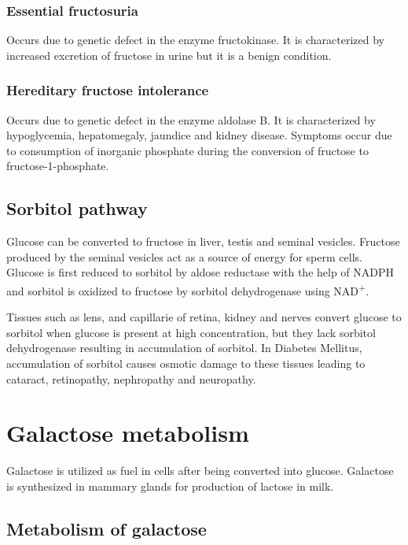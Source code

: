 \documentclass[
]{book}
\begin{document}
\subsection{Essential fructosuria}\label{essential-fructosuria}

Occurs due to genetic defect in the enzyme fructokinase. It is characterized by increased excretion of fructose in urine but it is a benign condition.

\subsection{Hereditary fructose intolerance}\label{hereditary-fructose-intolerance}

Occurs due to genetic defect in the enzyme aldolase B. It is characterized by hypoglycemia, hepatomegaly, jaundice and kidney disease. Symptoms occur due to consumption of inorganic phosphate during the conversion of fructose to fructose-1-phosphate.

\section{Sorbitol pathway}\label{sorbitol-pathway-1}

Glucose can be converted to fructose in liver, testis and seminal vesicles. Fructose produced by the seminal vesicles act as a source of energy for sperm cells. Glucose is first reduced to sorbitol by aldose reductase with the help of NADPH and sorbitol is oxidized to fructose by sorbitol dehydrogenase using NAD\textsuperscript{+}.

Tissues such as lens, and capillarie of retina, kidney and nerves convert glucose to sorbitol when glucose is present at high concentration, but they lack sorbitol dehydrogenase resulting in accumulation of sorbitol. In Diabetes Mellitus, accumulation of sorbitol causes osmotic damage to these tissues leading to cataract, retinopathy, nephropathy and neuropathy.

\chapter{Galactose metabolism}\label{galactose-metabolism}

Galactose is utilized as fuel in cells after being converted into glucose. Galactose is synthesized in mammary glands for production of lactose in milk.

\section{Metabolism of galactose}\label{metabolism-of-galactose}
\end{document}
